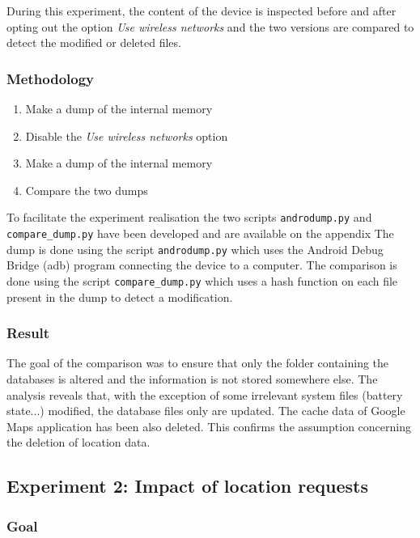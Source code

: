 During this experiment, the content of the device is inspected before and after opting out the option \emph{Use wireless networks} and the two versions are compared to detect the modified or deleted files.

\subsubsection{Methodology}

\begin{enumerate}
\item Make a dump of the internal memory
\item Disable the \emph{Use wireless networks} option
\item Make a dump of the internal memory
\item Compare the two dumps
\end{enumerate}

To facilitate the experiment realisation the two scripts \texttt{androdump.py} and \texttt{compare\_dump.py} have been developed and are available on the appendix %
The dump is done using the script \texttt{androdump.py} which uses the Android Debug Bridge (adb) program connecting the device to a computer.
The comparison is done using the script \texttt{compare\_dump.py} which uses a hash function on each file present in the dump to detect a modification.

\subsubsection{Result}

The goal of the comparison was to ensure that only the folder containing the databases is altered and the information is not stored somewhere else.
The analysis reveals that, with the exception of some irrelevant system files (battery state...) modified, the database files only are updated.
The cache data of Google Maps application has been also deleted.
This confirms the assumption concerning the deletion of location data.\\

\subsection{Experiment 2: Impact of location requests}

\subsubsection{Goal}

